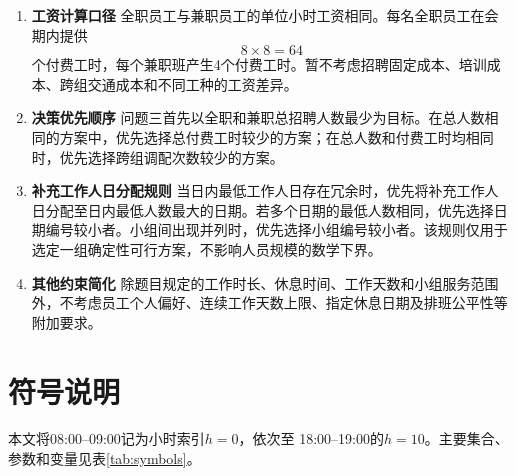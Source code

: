 \documentclass[withoutpreface,bwprint]{cumcmthesis}
\begin{document}
\begin{enumerate}[label=\textbf{A\arabic*:}, wide=\parindent]
  \item \textbf{工资计算口径}
  全职员工与兼职员工的单位小时工资相同。每名全职员工在会期内提供
  \[
  8\times8=64
  \]
  个付费工时，每个兼职班产生4个付费工时。暂不考虑招聘固定成本、培训成本、跨组交通成本和不同工种的工资差异。

  \item \textbf{决策优先顺序}
  问题三首先以全职和兼职总招聘人数最少为目标。在总人数相同的方案中，优先选择总付费工时较少的方案；在总人数和付费工时均相同时，优先选择跨组调配次数较少的方案。

  \item \textbf{补充工作人日分配规则}
  当日内最低工作人日存在冗余时，优先将补充工作人日分配至日内最低人数最大的日期。若多个日期的最低人数相同，优先选择日期编号较小者。小组间出现并列时，优先选择小组编号较小者。该规则仅用于选定一组确定性可行方案，不影响人员规模的数学下界。

  \item \textbf{其他约束简化}
  除题目规定的工作时长、休息时间、工作天数和小组服务范围外，不考虑员工个人偏好、连续工作天数上限、指定休息日期及排班公平性等附加要求。

\end{enumerate}

\section{符号说明}

本文将08:00--09:00记为小时索引$h=0$，依次至
18:00--19:00的$h=10$。主要集合、参数和变量见表\ref{tab:symbols}。
\end{document}
